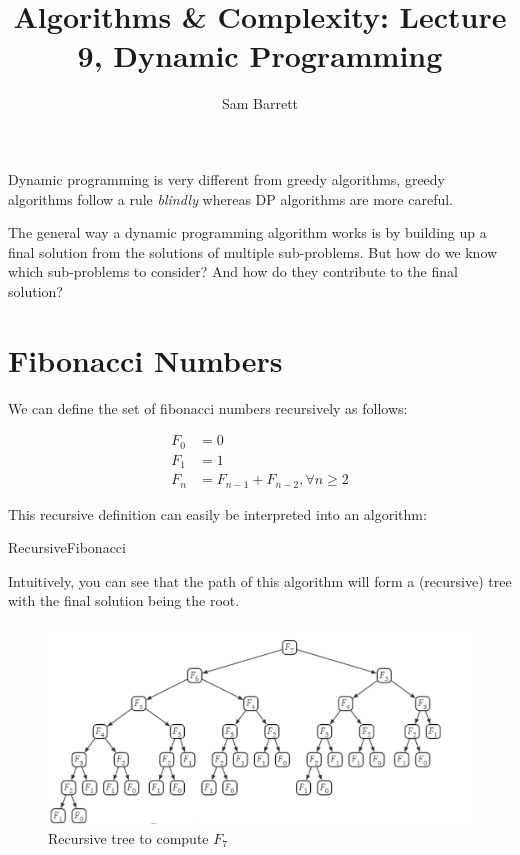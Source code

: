 \documentclass{article}
\title{Algorithms \& Complexity: Lecture 9, Dynamic Programming}
\author{Sam Barrett}
\begin{document}
\maketitle

Dynamic programming is very different from greedy algorithms, greedy algorithms follow a rule \textit{blindly} whereas DP algorithms are more careful.

The general way a dynamic programming algorithm works is by building up a final solution from the solutions of multiple sub-problems. But how do we know which sub-problems to consider? And how do they contribute to the final solution?

\section{Fibonacci Numbers}

We can define the set of fibonacci numbers recursively as follows:

\begin{align*}
  F_{0} &= 0 \\
  F_{1} &= 1 \\
  F_{n} &= F_{n-1} + F_{n-2}, \forall n \geq 2
\end{align*}

This recursive definition can easily be interpreted into an algorithm:

\begin{algorithm}
  \caption{RecursiveFibonacci}
\end{algorithm}

Intuitively, you can see that the path of this algorithm will form a (recursive) tree with the final solution being the root.

\begin{figure}[ht]
  \centering
  \includegraphics[scale=0.5]{figures/l9-1.png}
  \caption{\label{fig:fibtree} Recursive tree to compute $F_{7}$}
\end{figure}
\end{document}
